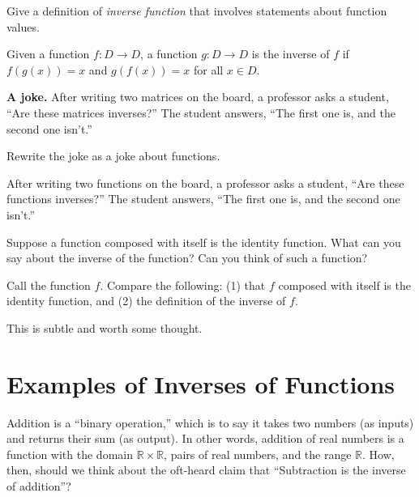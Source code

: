\documentclass{ximera}
\begin{document}
\begin{question}
Give a definition of \emph{inverse function} that involves statements about function values.    
\begin{freeResponse}
\begin{hint}
Given a function $f:D\rightarrow D$, a function $g:D\rightarrow D$ is the inverse of $f$ if $f(g(x)) = x$ and $g(f(x)) = x$ for all $x\in D$.  
\end{hint}
\end{freeResponse}
\end{question}

\textbf{A joke.}  After writing two matrices on the board, a professor asks a student, ``Are these matrices inverses?''  The student answers, ``The first one is, and the second one isn't.''  

\begin{question}
Rewrite the joke as a joke about functions.  
\begin{freeResponse}
\begin{hint}
After writing two functions on the board, a professor asks a student, ``Are these functions inverses?''  The student answers, ``The first one is, and the second one isn't.''  
\end{hint}
\end{freeResponse}
\end{question}

\begin{question}
Suppose a function composed with itself is the identity function.  What can you say about the inverse of the function?  Can you think of such a function?  
\begin{hint}
Call the function $f$.  Compare the following:  (1) that $f$ composed with itself is the identity function, and (2) the definition of the inverse of $f$.
\end{hint}
\begin{freeResponse}
\begin{hint}
This is subtle and worth some thought.  
\end{hint}
\end{freeResponse}
\end{question}

\section*{Examples of Inverses of Functions}
Addition is a ``binary operation,'' which is to say it takes two numbers (as inputs) and returns their sum (as output).  In other words, addition of real numbers is a function with the domain $\mathbb R\times \mathbb R$, pairs of real numbers, and the range $\mathbb R$.  How, then, 
should we think about the oft-heard claim that ``Subtraction is the inverse of addition''?  
\end{document}
